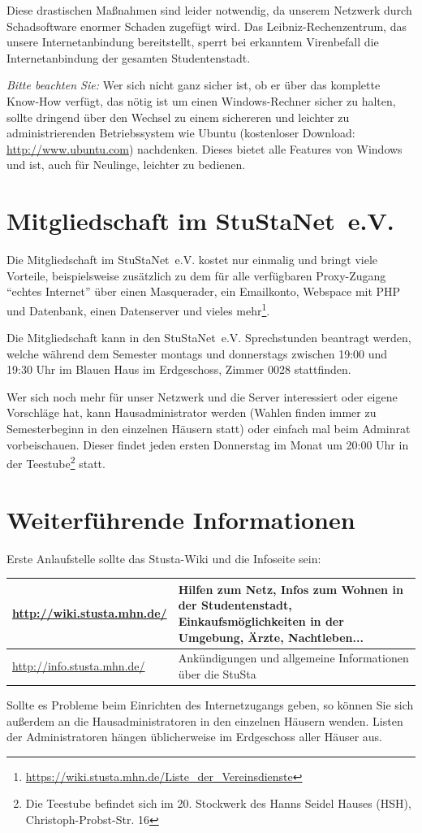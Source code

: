 \documentclass[a4paper,12pt,draft]{scrartcl}
\begin{document}
Diese drastischen Maßnahmen sind leider notwendig, da unserem Netzwerk durch Schadsoftware enormer Schaden zugefügt wird. Das Leibniz-Rechenzentrum, das unsere Internetanbindung bereitstellt, sperrt bei erkanntem Virenbefall die Internetanbindung der gesamten Studentenstadt.

\emph{Bitte beachten Sie:} Wer sich nicht ganz sicher ist, ob er über das komplette Know-How verfügt, das nötig ist um einen Windows-Rechner sicher zu halten, sollte dringend über den Wechsel zu einem sichereren und leichter zu administrierenden Betriebssystem wie Ubuntu (kostenloser Download: \url{http://www.ubuntu.com}) nachdenken. Dieses bietet alle Features von Windows und ist, auch für Neulinge, leichter zu bedienen.


\section*{Mitgliedschaft im StuStaNet~e.V.}

Die Mitgliedschaft im StuStaNet~e.V. kostet nur einmalig  und bringt viele Vorteile, beispielsweise zusätzlich zu dem für alle verfügbaren Proxy-Zugang "`echtes Internet"' über einen Masquerader, ein Emailkonto, Webspace mit PHP und Datenbank, einen Datenserver und vieles mehr\footnote{\url{https://wiki.stusta.mhn.de/Liste\_der\_Vereinsdienste}}.

Die Mitgliedschaft kann in den StuStaNet~e.V. Sprechstunden beantragt werden, welche während dem Semester montags und donnerstags zwischen 19:00 und 19:30 Uhr im Blauen Haus im Erdgeschoss, Zimmer 0028 stattfinden.

Wer sich noch mehr für unser Netzwerk und die Server interessiert oder eigene Vorschläge hat, kann Hausadministrator werden (Wahlen finden immer zu Semesterbeginn in den einzelnen Häusern statt) oder einfach mal beim Adminrat vorbeischauen. Dieser findet jeden ersten Donnerstag im Monat um 20:00 Uhr in der Teestube\footnote{Die Teestube befindet sich im 20. Stockwerk des Hanns Seidel Hauses (HSH), Christoph-Probst-Str. 16} statt.

\section*{Weiterführende Informationen}

Erste Anlaufstelle sollte das Stusta-Wiki und die Infoseite sein:

\begin{center}
  \begin{tabularx}{\linewidth}{|lX|}
    \hline
    \url{http://wiki.stusta.mhn.de/} & Hilfen zum Netz, Infos zum Wohnen in der Studentenstadt, Einkaufsmöglichkeiten in der Umgebung, Ärzte, Nachtleben...\\
    \hline
    \url{http://info.stusta.mhn.de/} & Ankündigungen und allgemeine Informationen über die StuSta\\
    \hline
  \end{tabularx}
\end{center}
Sollte es Probleme beim Einrichten des Internetzugangs geben, so können Sie sich außerdem an die Hausadministratoren in den einzelnen Häusern wenden. Listen der Administratoren hängen üblicherweise im Erdgeschoss aller Häuser aus.
\end{document}
